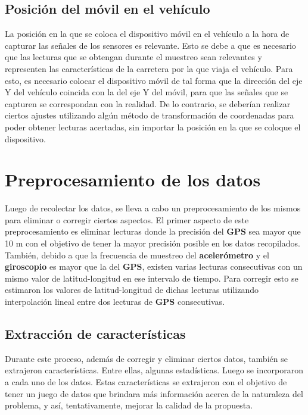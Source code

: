 	\subsection{Posición del móvil en el vehículo}
		La posición en la que se coloca el dispositivo móvil en el vehículo a la hora de capturar las señales de los sensores es
		relevante. Esto se debe a que es necesario que las lecturas que se obtengan durante el muestreo sean relevantes y representen
		las características de la carretera por la que viaja el vehículo. Para esto, es necesario colocar el dispositivo móvil de tal 
		forma que la dirección del eje Y del vehículo coincida con la del eje Y del móvil, para que las señales que se capturen
		se correspondan con la realidad. De lo contrario, se deberían realizar ciertos ajustes utilizando algún método de
		transformación de coordenadas para poder obtener lecturas acertadas, sin importar la posición en la que se coloque
		el dispositivo.

\section{Preprocesamiento de los datos}
	Luego de recolectar los datos, se lleva a cabo un preprocesamiento de los mismos para eliminar o corregir ciertos aspectos.
	El primer aspecto de este preprocesamiento es eliminar lecturas donde la precisión del \textbf{GPS} sea mayor que 10 m
	con el objetivo de tener la mayor precisión posible en los datos recopilados.\\
	\indent También, debido a que la frecuencia de muestreo del \textbf{acelerómetro} y el \textbf{giroscopio} es mayor que la del
	\textbf{GPS}, existen varias lecturas consecutivas con un mismo valor de latitud-longitud en ese intervalo de tiempo. Para
	corregir esto se estimaron los valores de latitud-longitud de dichas lecturas utilizando interpolación lineal entre dos lecturas
	de \textbf{GPS} consecutivas.

	\subsection{Extracción de características}
		Durante este proceso, además de corregir y eliminar ciertos datos, también se extrajeron características. Entre ellas,
		algunas estadísticas.  Luego se incorporaron a cada uno de los datos. Estas características se extrajeron con el objetivo
		de tener un juego de datos que brindara más información acerca de la naturaleza del problema, y así, tentativamente,
		mejorar la calidad de la propuesta.\\

